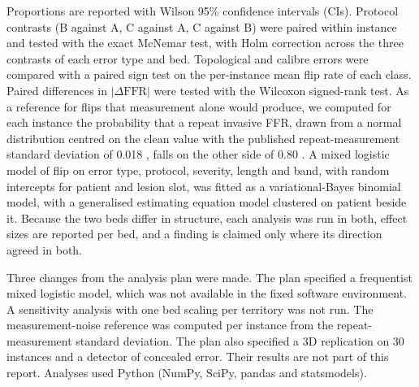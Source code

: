 Proportions are reported with Wilson 95\% confidence intervals (CIs). Protocol contrasts (B against A, C against A,
C against B) were paired within instance and tested with the exact McNemar test, with Holm correction across the
three contrasts of each error type and bed. Topological and calibre errors were compared with a paired sign test on
the per-instance mean flip rate of each class. Paired differences in $|\Delta\mathrm{FFR}|$ were tested with the
Wilcoxon signed-rank test. As a reference for flips that measurement alone would produce, we computed for each
instance the probability that a repeat invasive FFR, drawn from a normal distribution centred on the clean value with
the published repeat-measurement standard deviation of 0.018 \cite{johnson2015}, falls on the other side of 0.80
\cite{petraco2013}. A mixed logistic model of flip on error type, protocol, severity, length and band, with random
intercepts for patient and lesion slot, was fitted as a variational-Bayes binomial model, with a generalised
estimating equation model clustered on patient beside it. Because the two beds differ in structure, each analysis
was run in both, effect sizes are reported per bed, and a finding is claimed only where its direction agreed in
both.

Three changes from the analysis plan were made. The plan specified a frequentist mixed logistic model, which was not
available in the fixed software environment. A sensitivity analysis with one bed scaling per territory was not run.
The measurement-noise reference was computed per instance from the repeat-measurement standard deviation. The plan also specified a 3D replication on
30 instances and a detector of concealed error. Their results are not part of this report. Analyses used Python
(NumPy, SciPy, pandas and statsmodels).
